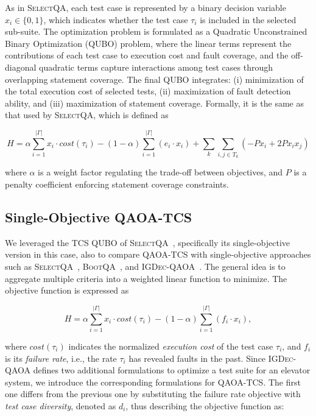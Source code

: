 As in \textsc{SelectQA}, each test case is represented by a binary decision variable $x_i \in \{0,1\}$, which indicates whether the test case $\tau_i$ is included in the selected sub-suite. The optimization problem is formulated as a Quadratic Unconstrained Binary Optimization (QUBO) problem, where the linear terms represent the contributions of each test case to execution cost and fault coverage, and the off-diagonal quadratic terms capture interactions among test cases through overlapping statement coverage. The final QUBO integrates: (i) minimization of the total execution cost of selected tests, (ii) maximization of fault detection ability, and (iii) maximization of statement coverage.
Formally, it is the same as that used by \textsc{SelectQA}, which is defined as

\begin{equation}
H = \alpha \sum_{i=1}^{|\Gamma|} x_i \cdot cost(\tau_i) 
  - (1-\alpha)\sum_{i=1}^{|\Gamma|} (e_i \cdot x_i) 
  + \sum_{k}\sum_{i,j \in T_k} (-P x_i + 2 P x_i x_j)
\end{equation}

where $\alpha$ is a weight factor regulating the trade-off between objectives, and $P$ is a penalty coefficient enforcing statement coverage constraints.

\subsection{Single-Objective QAOA-TCS}
\label{sec:3.1.2}

We leveraged the TCS QUBO of \textsc{SelectQA}~\citep{selectqa}, specifically its single-objective version in this case, also to compare \textsc{QAOA-TCS} with single-objective approaches such as \textsc{SelectQA}~\citep{selectqa}, \textsc{BootQA}~\citep{bootqa}, and \textsc{IGDec-QAOA}~\citep{igdec_qaoa}. The general idea is to aggregate multiple criteria into a weighted linear function to minimize. 
The objective function is expressed as 

\begin{equation}
H = \alpha \sum_{i=1}^{|\Gamma|} x_i \cdot cost(\tau_i) 
  - (1-\alpha) \sum_{i=1}^{|\Gamma|} (f_i \cdot x_i),
\end{equation}

where $cost(\tau_i)$ indicates the normalized \emph{execution cost} of the test case $\tau_i$, and $f_i$ is its \emph{failure rate}, i.e., the rate $\tau_i$ has revealed faults in the past.  
Since \textsc{IGDec-QAOA} defines two additional formulations to optimize a test suite for an elevator system, we introduce the corresponding formulations for \textsc{QAOA-TCS}.
The first one differs from the previous one by substituting the failure rate objective with \emph{test case diversity}, denoted as $d_i$, thus describing the objective function as:

